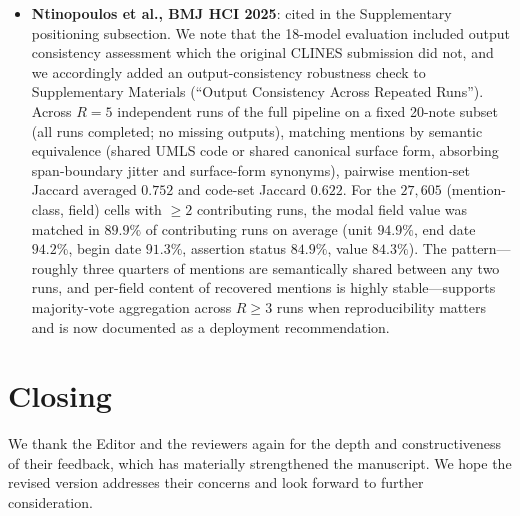 \documentclass[11pt,letterpaper]{article}
\begin{document}
{\begin{itemize}[leftmargin=*]
    \item \textbf{Ntinopoulos et al., BMJ HCI 2025}: cited in the Supplementary positioning subsection. We note that the 18-model evaluation included output consistency assessment which the original CLINES submission did not, and we accordingly added an output-consistency robustness check to Supplementary Materials (``Output Consistency Across Repeated Runs''). Across $R=5$ independent runs of the full pipeline on a fixed 20-note subset (all runs completed; no missing outputs), matching mentions by semantic equivalence (shared UMLS code or shared canonical surface form, absorbing span-boundary jitter and surface-form synonyms), pairwise mention-set Jaccard averaged $0.752$ and code-set Jaccard $0.622$. For the $27{,}605$ (mention-class, field) cells with $\geq 2$ contributing runs, the modal field value was matched in $89.9\%$ of contributing runs on average (unit $94.9\%$, end date $94.2\%$, begin date $91.3\%$, assertion status $84.9\%$, value $84.3\%$). The pattern---roughly three quarters of mentions are semantically shared between any two runs, and per-field content of recovered mentions is highly stable---supports majority-vote aggregation across $R\geq 3$ runs when reproducibility matters and is now documented as a deployment recommendation.
\end{itemize}}

\hrulefill

\section*{Closing}

We thank the Editor and the reviewers again for the depth and constructiveness of their feedback, which has materially strengthened the manuscript. We hope the revised version addresses their concerns and look forward to further consideration.
\end{document}
